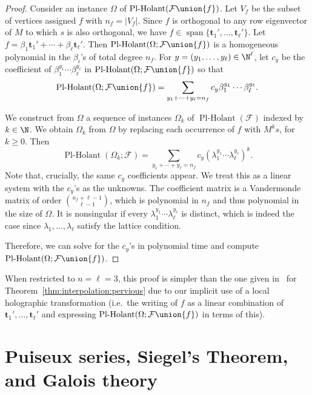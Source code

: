 \documentclass[11pt]{article}
\newcommand{\PlHolant}{\operatorname{Pl-Holant}}
\newenvironment{remark}{\medskip{\bfseries \noindent Remark:}}{\par\medskip}{\par\medskip}
\begin{document}
\begin{proof}
 Consider an instance $\Omega$ of $\PlHolant(\mathcal{F} \union \{f\})$.
 Let $V_f$ be the subset of vertices assigned $f$ with $n_f = |V_f|$.
 Since $f$ is orthogonal to any row eigenvector of $M$ to which $s$ is also orthogonal,
 we have $f \in \operatorname{span}\{\mathbf{t}_1', \dotsc, \mathbf{t}_\ell'\}$.
 Let $f = \beta_1 \mathbf{t}_1' + \dotsb + \beta_\ell \mathbf{t}_\ell'$.
 Then $\PlHolant(\Omega; \mathcal{F} \union \{f\})$ is a homogeneous polynomial in the $\beta_i$'s of total degree $n_f$.
 For $y = (y_1, \ldots, y_\ell) \in \N^\ell$,
 let $c_y$ be the coefficient of $\beta_1^{y_1} \dotsb \beta_\ell^{y_\ell}$ in $\PlHolant(\Omega; \mathcal{F} \union \{f\})$ so that
 \[
  \PlHolant(\Omega; \mathcal{F} \union \{f\}) = \sum_{y_1 + \dotsb + y_\ell = n_f} c_y \beta_1^{y_1} \dotsb \beta_\ell^{y_\ell}.
 \]
 
 We construct from $\Omega$ a sequence of instances $\Omega_k$ of $\PlHolant(\mathcal{F})$ indexed by $k \in \N$.
 We obtain $\Omega_k$ from $\Omega$ by replacing each occurrence of $f$ with $M^k s$, for $k \ge 0$.
 Then
 \[
  \PlHolant(\Omega_k; \mathcal{F}) = \sum_{y_1 + \dotsb + y_\ell = n_f} c_y \left(\lambda_1^{y_1} \dotsb \lambda_\ell^{y_\ell}\right)^k.
 \]
 Note that, crucially, the same $c_y$ coefficients appear.
 We treat this as a linear system with the $c_y$'s as the unknowns.
 The coefficient matrix is  a Vandermonde matrix of order $\binom{n_f + \ell - 1}{\ell - 1}$,
 which is polynomial in $n_f$ and thus polynomial in the size of $\Omega$.
 It is nonsingular if every $\lambda_1^{y_1} \dotsb \lambda_\ell^{y_\ell}$ is distinct,
 which is indeed the case since $\lambda_1, \dotsc, \lambda_\ell$ satisfy the lattice condition.
 
 Therefore, we can solve for the $c_y$'s in polynomial time and compute $\PlHolant(\Omega; \mathcal{F} \union \{f\})$.
\end{proof}

\begin{remark}
 When restricted to $n = \ell = 3$,
 this proof is simpler than the one given in~\cite{CLX12} for Theorem~\ref{thm:interpolation:pervious}
 due to our implicit use of a local holographic transformation
 (i.e.~the writing of $f$ as a linear combination of $\mathbf{t}_1', \dotsc, \mathbf{t}_\ell'$
 and expressing $\PlHolant(\Omega; \mathcal{F} \union \{f\})$ in terms of this).
\end{remark}

\section{Puiseux series, Siegel's Theorem, and Galois theory} \label{sec:ternary}
\end{document}
